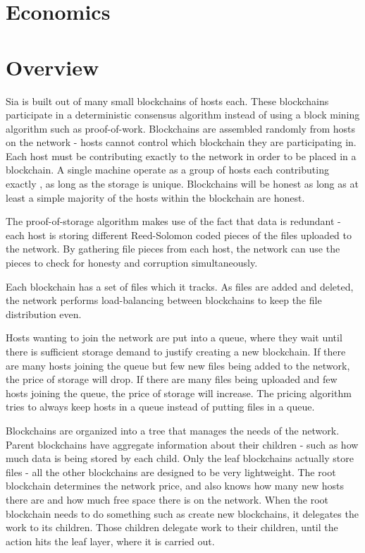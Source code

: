 \documentclass[twocolumn]{article}
\begin{document}
\section{Economics}

\section{Overview}

Sia is built out of many small blockchains of \numhosts{} hosts each.
These blockchains participate in a deterministic consensus algorithm instead of using a block mining algorithm such as proof-of-work.
Blockchains are assembled randomly from hosts on the network - hosts cannot control which blockchain they are participating in.
Each host must be contributing exactly \storageperhost{} to the network in order to be placed in a blockchain.
A single machine operate as a group of hosts each contributing exactly \storageperhost{}, as long as the storage is unique.
Blockchains will be honest as long as at least a simple majority of the hosts within the blockchain are honest.

The proof-of-storage algorithm makes use of the fact that data is redundant - each host is storing different Reed-Solomon coded pieces of the files uploaded to the network.
By gathering file pieces from each host, the network can use the pieces to check for honesty and corruption simultaneously.

Each blockchain has a set of files which it tracks.
As files are added and deleted, the network performs load-balancing between blockchains to keep the file distribution even.

Hosts wanting to join the network are put into a queue, where they wait until there is sufficient storage demand to justify creating a new blockchain.
If there are many hosts joining the queue but few new files being added to the network, the price of storage will drop.
If there are many files being uploaded and few hosts joining the queue, the price of storage will increase.
The pricing algorithm tries to always keep hosts in a queue instead of putting files in a queue.

Blockchains are organized into a tree that manages the needs of the network.
Parent blockchains have aggregate information about their children - such as how much data is being stored by each child.
Only the leaf blockchains actually store files - all the other blockchains are designed to be very lightweight.
The root blockchain determines the network price, and also knows how many new hosts there are and how much free space there is on the network.
When the root blockchain needs to do something such as create new blockchains, it delegates the work to its children.
Those children delegate work to their children, until the action hits the leaf layer, where it is carried out.
\end{document}
